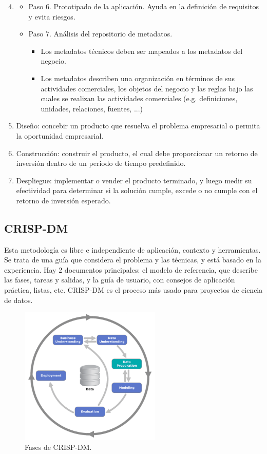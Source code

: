 \begin{enumerate}
\setcounter{enumi}{3}
\item[] \quad 
\begin{itemize}
\item Paso 6. Prototipado de la aplicación. Ayuda en la definición de requisitos y evita riesgos.
\item Paso 7. Análisis del repositorio de metadatos.
\begin{itemize}
\item Los metadatos técnicos deben ser mapeados a los metadatos del negocio. 
\item Los metadatos describen una organización en términos de sus actividades comerciales, los objetos del negocio y las reglas bajo las cuales se realizan las actividades comerciales (e.g. definiciones, unidades, relaciones, fuentes, ...)
\end{itemize}
\end{itemize}
\item Diseño: concebir un producto que resuelva el problema empresarial o permita la oportunidad empresarial.
\item Construcción: construir el producto, el cual debe proporcionar un retorno de inversión dentro de un periodo de tiempo predefinido.
\item Despliegue: implementar o vender el producto terminado, y luego medir su efectividad para determinar si la solución cumple, excede o no cumple con el retorno de inversión esperado.
\end{enumerate}

\subsection{CRISP-DM}

Esta metodología es libre e independiente de aplicación, contexto y herramientas. Se trata de una guía que considera el problema y las técnicas, y está basado en la experiencia. Hay 2 documentos principales: el modelo de referencia, que describe las fases, tareas y salidas, y la guía de usuario, con consejos de aplicación práctica, listas, etc. CRISP-DM es el proceso más usado para proyectos de ciencia de datos. \\

\begin{figure}[h]
\centering
\includegraphics[width=0.6\textwidth]{fotos/12.png}
\caption{Fases de CRISP-DM.}
\label{fig:12}
\end{figure}


